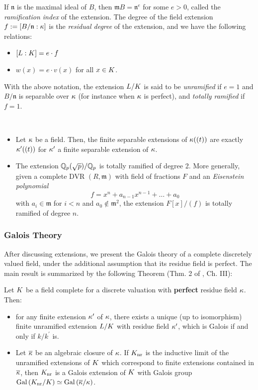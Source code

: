 \documentclass[a4paper, oneside]{memoir}
\begin{document}
If $\mathfrak{n}$ is the maximal ideal of $B$, then $\mathfrak{m}B=\mathfrak{n}^e$ for some $e>0$, called the
\textit{ramification index} of the extension. The degree of the field extension $f:=[B /\mathfrak{n}:\kappa]$
is the \textit{residual degree} of the extension, and we have the following relations:
\begin{itemize}
	\item \( [L:K]=e\cdot f \)
	\item $w(x) = e\cdot v(x)$ for all $x\in K$.
\end{itemize}

\begin{definition}
	With the above notation, the extension $L/K$ is said to be \textit{unramified} if $e=1$ and $B /\mathfrak{n}$ is separable over $\kappa$ (for instance when $\kappa$ is perfect), and \textit{totally ramified} if $f=1$.
\end{definition}

\begin{example}\
	\begin{itemize}
		\item Let $\kappa$ be a field. Then, the finite separable extensions of $\kappa((t))$ are exactly $\kappa^{\prime}((t))$ for $\kappa^{\prime} $ a finite separable extension of $\kappa$.
		\item The extension $\mathbb{Q}_p(\sqrt{p})/\mathbb{Q}_p$ is totally ramified of degree 2. More generally, given a complete DVR $(R,\mathfrak{m})$ with field of fractions $F$ and an \textit{Eisenstein polynomial}
		      \[
			      f=x^n+a_{n-1}x^{n-1}+\ldots+a_0
		      \]
		      with $a_i\in\mathfrak{m}$ for $i<n$ and $a_0\not\in\mathfrak{m}^2$, the extension $F[x]/(f)$ is totally ramified of degree $n$.
	\end{itemize}
\end{example}
\subsubsection{Galois Theory}
After discussing extensions, we present the Galois theory of a complete discretely valued field, under the additional assumption that its residue field is perfect. The main result is summarized by the following Theorem (Thm. 2 of \cite{SerreCL}, Ch. III):

\begin{theorem}Let $K$ be a field complete for a discrete valuation with \textbf{perfect} residue field $\kappa$. Then:
	\begin{itemize}
		\item for any finite extension $\kappa^{\prime} $ of \(\kappa\), there exists a unique (up to isomorphism) finite unramified extension $L / K$ with residue field $\kappa^{\prime} $, which is Galois if and only if $k/k^{\prime}$ is.
		\item Let \(\overline{\kappa}\) be an algebraic closure of \(\kappa\). If $K_{\text{nr}}$ is the inductive limit of the unramified extensions of $K$ which correspond to finite extensions
		      contained in $\overline{\kappa}$, then $K_{\text{nr}}$ is a Galois extension of $K$ with Galois group $\operatorname{Gal}{(K_{\text{nr}}/K)}\simeq \operatorname{Gal}{(\overline{\kappa}/\kappa)}$.
	\end{itemize}
\end{theorem}
\end{document}
